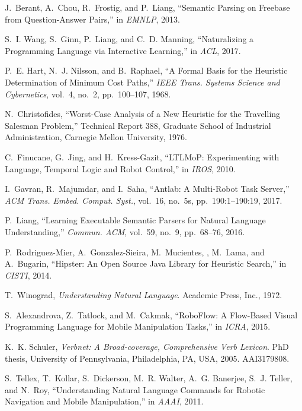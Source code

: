 \documentclass[letterpaper, 10 pt, conference]{ieeeconf}  %
\begin{document}
\begin{thebibliography}{10}
J.~Berant, A.~Chou, R.~Frostig, and P.~Liang, ``{Semantic Parsing on {F}reebase
  from Question-Answer Pairs},'' in {\em EMNLP}, 2013.

S.~I. Wang, S.~Ginn, P.~Liang, and C.~D. Manning, ``{Naturalizing a Programming
  Language via Interactive Learning},'' in {\em ACL}, 2017.

P.~E. Hart, N.~J. Nilsson, and B.~Raphael, ``{A Formal Basis for the Heuristic
  Determination of Minimum Cost Paths},'' {\em IEEE Trans. Systems Science and
  Cybernetics}, vol.~4, no.~2, pp.~100--107, 1968.

N.~Christofides, ``{Worst-Case Analysis of a New Heuristic for the Travelling
  Salesman Problem},'' Technical Report 388, Graduate School of Industrial
  Administration, Carnegie Mellon University, 1976.

C.~Finucane, G.~Jing, and H.~Kress{-}Gazit, ``{LTLMoP: Experimenting with
  Language, Temporal Logic and Robot Control},'' in {\em IROS}, 2010.

I.~Gavran, R.~Majumdar, and I.~Saha, ``{Antlab: A Multi-Robot Task Server},''
  {\em ACM Trans. Embed. Comput. Syst.}, vol.~16, no.~5s, pp.~190:1--190:19,
  2017.

P.~Liang, ``{Learning Executable Semantic Parsers for Natural Language
  Understanding},'' {\em Commun. {ACM}}, vol.~59, no.~9, pp.~68--76, 2016.

P.~Rodriguez-Mier, A.~Gonzalez-Sieira, M.~Mucientes, , M.~Lama, and A.~Bugarin,
  ``{Hipster: An Open Source Java Library for Heuristic Search},'' in {\em
  CISTI}, 2014.

T.~Winograd, {\em {Understanding Natural Language}}.
\newblock Academic Press, Inc., 1972.

S.~Alexandrova, Z.~Tatlock, and M.~Cakmak, ``{RoboFlow: A Flow-Based Visual
  Programming Language for Mobile Manipulation Tasks},'' in {\em ICRA}, 2015.

K.~K. Schuler, {\em {Verbnet: A Broad-coverage, Comprehensive Verb Lexicon}}.
\newblock PhD thesis, University of Pennsylvania, Philadelphia, PA, USA, 2005.
\newblock AAI3179808.

S.~Tellex, T.~Kollar, S.~Dickerson, M.~R. Walter, A.~G. Banerjee, S.~J. Teller,
  and N.~Roy, ``{Understanding Natural Language Commands for Robotic Navigation
  and Mobile Manipulation},'' in {\em AAAI}, 2011.


\end{thebibliography}
\end{document}
